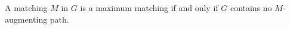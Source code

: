 

\setcounter{section}{4}
\setcounter{subsection}{2}
\setcounter{dfn}{5}

\begin{thm}[Berge]
A matching $M$ in $G$ is a maximum matching if and only if $G$ contains no $M$-augmenting path.
\end{thm}

